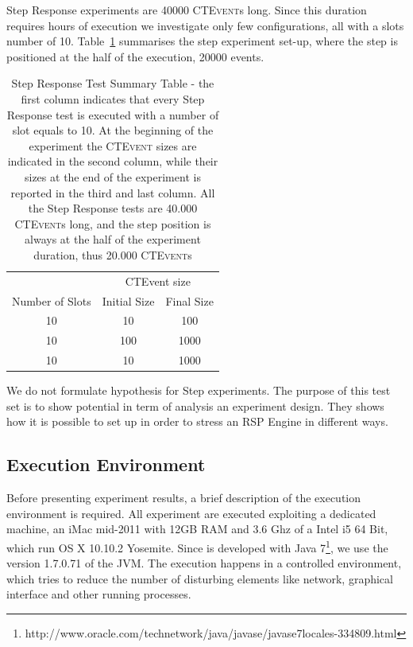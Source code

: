 Step Response experiments are 40000 \textsc{CTEvent}s long. Since this duration requires hours of execution we investigate only few configurations, all with a slots number of 10. Table~\ref{tab:steptests} summarises the step experiment set-up, where the step is positioned at the half of the execution, 20000 events.
\begin{table}[htb]
\centering
 \begin{tabular}{c|c|c}
	  	\hline
	  	&\multicolumn{2}{c}{CTEvent size}  \\
		Number of Slots & Initial Size & Final Size\\
		\hline
		\hline
		 10 & 10 & 100\\
		 10 & 100 & 1000\\
		 10 & 10 & 1000\\
		\hline 
 \end{tabular}
 \caption[Step Response Tests Summary Table]{Step Response Test Summary Table -  the first column indicates that every Step Response test is executed with a number of slot equals to 10. At the beginning of the experiment the \textsc{CTEvent} sizes are indicated in the second column, while their sizes at the end of the experiment is reported in the third and last column. All the Step Response tests are 40.000 \textsc{CTEvent}s long, and the step position is always at the half of the experiment duration, thus 20.000 \textsc{CTEvent}s}
\label{tab:steptests}
\end{table}

We do not formulate hypothesis for Step experiments. The purpose of this test set is to show \name potential in term of analysis an experiment design. They shows how it is possible to set up \name in order to stress an RSP Engine in different ways.

\subsection{Execution Environment}\label{sec:execution-environment}

Before presenting experiment results, a brief description of the execution environment is required. All experiment are executed exploiting a dedicated machine, an iMac mid-2011 with 12GB RAM and 3.6 Ghz of a Intel i5 64 Bit, which run OS X 10.10.2 Yosemite. Since \name is developed with Java 7\footnote{http://www.oracle.com/technetwork/java/javase/javase7locales-334809.html}, we use the version 1.7.0.71 of the JVM.
The execution happens in a controlled environment, which tries to reduce the number of disturbing elements like network, graphical interface and other running processes.

